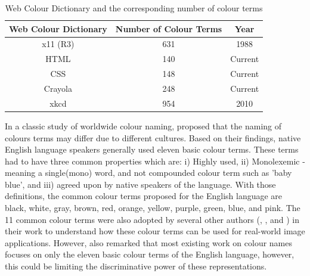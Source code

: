 \begin{table}[hbt!]
\centering
\begin{tabular}{|c|c|c|}
\hline
\multicolumn{1}{|c|}{\textbf{Web Colour Dictionary}} & \multicolumn{1}{c|}{\textbf{Number of Colour Terms}} & \multicolumn{1}{c|}{\textbf{Year}} \\ \hline
x11 (R3)                                            & 631                                                 & 1988                               \\ \hline
HTML                                                & 140                                                 & Current                            \\ \hline
CSS                                                 & 148                                                 & Current                            \\ \hline
Crayola                                             & 248                                                 & Current                            \\ \hline
xkcd                                                & 954                                                 & 2010                               \\ \hline
\end{tabular}
\caption[Web Colour Dictionary and the corresponding number of colour terms]{Web Colour Dictionary and the corresponding number of colour terms}
\label{table:allcolourterms}
\end{table}




In a classic study of worldwide colour naming,  proposed that the naming of colours terms may differ due to different cultures. Based on their findings, native English language speakers generally used eleven basic colour terms. These terms had to have three common properties which are: i) Highly used, ii) Monolexemic - meaning a single(mono) word, and not compounded colour term such as 'baby blue', and iii) agreed upon by native speakers of the language. With those definitions, the common colour terms proposed for the English language are black, white, gray, brown, red, orange, yellow, purple, green, blue, and pink. The 11 common colour terms were also adopted by several other authors (, , and ) in their work to understand how these colour terms can be used for real-world image applications. However,  also remarked that most existing work on colour names focuses on only the eleven basic colour terms of the English language, however, this could be limiting the discriminative power of these representations. 







